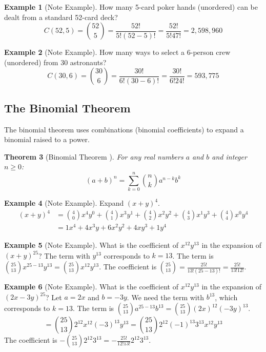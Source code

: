 \documentclass[11pt, a4paper]{article}
\newtheorem{theorem}{Theorem}[section]
\theoremstyle{definition}
\newtheorem{example}[theorem]{Example}
\begin{document}
\begin{example}[Note Example]
How many 5-card poker hands (unordered) can be dealt from a standard 52-card deck?
\[
C(52, 5) = \binom{52}{5} = \frac{52!}{5!(52-5)!} = \frac{52!}{5!47!} = 2,598,960
\]
\end{example}

\begin{example}[Note Example]
How many ways to select a 6-person crew (unordered) from 30 astronauts?
\[
C(30, 6) = \binom{30}{6} = \frac{30!}{6!(30-6)!} = \frac{30!}{6!24!} = 593,775
\]
\end{example}

\subsection{The Binomial Theorem}
The binomial theorem uses combinations (binomial coefficients) to expand a binomial raised to a power.

\begin{theorem}[Binomial Theorem \cite{Chan2021}]
For any real numbers $a$ and $b$ and integer $n \ge 0$:
\[
(a+b)^n = \sum_{k=0}^{n} \binom{n}{k} a^{n-k} b^k
\]
\end{theorem}

\begin{example}[Note Example]
Expand $(x+y)^4$.
\begin{align*}
(x+y)^4 &= \binom{4}{0}x^4y^0 + \binom{4}{1}x^3y^1 + \binom{4}{2}x^2y^2 + \binom{4}{3}x^1y^3 + \binom{4}{4}x^0y^4 \\
&= 1x^4 + 4x^3y + 6x^2y^2 + 4xy^3 + 1y^4
\end{align*}
\end{example}

\begin{example}[Note Example]
What is the coefficient of $x^{12}y^{13}$ in the expansion of $(x+y)^{25}$?
The term with $y^{13}$ corresponds to $k=13$.
The term is $\binom{25}{13} x^{25-13} y^{13} = \binom{25}{13} x^{12} y^{13}$.
The coefficient is $\binom{25}{13} = \frac{25!}{13!(25-13)!} = \frac{25!}{13!12!}$.
\end{example}

\begin{example}[Note Example]
What is the coefficient of $x^{12}y^{13}$ in the expansion of $(2x-3y)^{25}$?
Let $a = 2x$ and $b = -3y$. We need the term with $b^{13}$, which corresponds to $k=13$.
The term is $\binom{25}{13} a^{25-13} b^{13} = \binom{25}{13} (2x)^{12} (-3y)^{13}$.
\[
= \binom{25}{13} 2^{12} x^{12} (-3)^{13} y^{13} = \binom{25}{13} 2^{12} (-1)^{13} 3^{13} x^{12} y^{13}
\]
The coefficient is $-\binom{25}{13} 2^{12} 3^{13} = -\frac{25!}{12! 13!} 2^{12} 3^{13}$.
\end{example}
\end{document}

